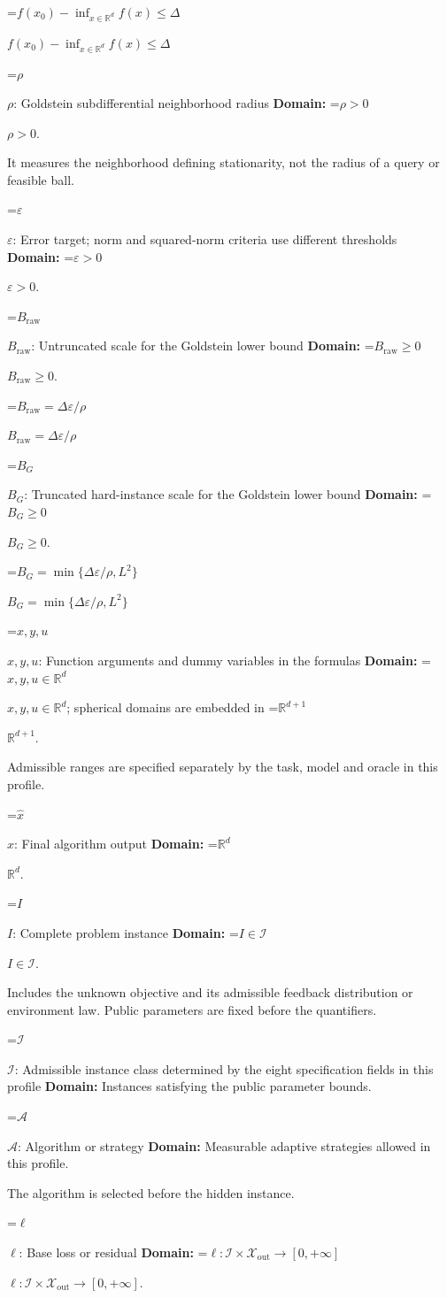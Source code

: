 \documentclass[10pt,a4paper]{article}
\newcommand{\AtlasMath}[1]{\par\begingroup\centering\setbox0=\hbox{$\displaystyle #1$}\ifdim\wd0>1.4\linewidth\typeout{ATLAS WIDE FORMULA: \the\wd0}\fi\ifdim\wd0>\linewidth\resizebox{\linewidth}{!}{\box0}\else\box0\fi\par\endgroup}
\newcommand{\AtlasInlineMath}[1]{\begingroup\setbox0=\hbox{$#1$}\ifdim\wd0>.4\linewidth\endgroup\AtlasMath{#1}\else\endgroup$#1$\fi}
\begin{document}
\AtlasInlineMath{f(x_0)-\inf_{x\in\mathbb{R}^d}f(x)\le\Delta}

\AtlasInlineMath{\rho}: Goldstein subdifferential neighborhood radius \textbf{Domain:} \AtlasInlineMath{\rho>0}.

It measures the neighborhood defining stationarity, not the radius of a query or feasible ball.

\AtlasInlineMath{\varepsilon}: Error target; norm and squared-norm criteria use different thresholds \textbf{Domain:} \AtlasInlineMath{\varepsilon>0}.

\AtlasInlineMath{B_{\mathrm{raw}}}: Untruncated scale for the Goldstein lower bound \textbf{Domain:} \AtlasInlineMath{B_{\mathrm{raw}}\ge0}.

\AtlasInlineMath{B_{\mathrm{raw}}=\Delta\varepsilon/\rho}

\AtlasInlineMath{B_G}: Truncated hard-instance scale for the Goldstein lower bound \textbf{Domain:} \AtlasInlineMath{B_G\ge0}.

\AtlasInlineMath{B_G=\min\{\Delta\varepsilon/\rho,L^2\}}

\AtlasInlineMath{x,y,u}: Function arguments and dummy variables in the formulas \textbf{Domain:} \AtlasInlineMath{x,y,u\in\mathbb{R}^d}; spherical domains are embedded in \AtlasInlineMath{\mathbb{R}^{d+1}}.

Admissible ranges are specified separately by the task, model and oracle in this profile.

\AtlasInlineMath{\widehat{x}}: Final algorithm output \textbf{Domain:} \AtlasInlineMath{\mathbb{R}^d}.

\AtlasInlineMath{I}: Complete problem instance \textbf{Domain:} \AtlasInlineMath{I\in\mathcal{I}}.

Includes the unknown objective and its admissible feedback distribution or environment law. Public parameters are fixed before the quantifiers.

\AtlasInlineMath{\mathcal{I}}: Admissible instance class determined by the eight specification fields in this profile \textbf{Domain:} Instances satisfying the public parameter bounds.

\AtlasInlineMath{\mathcal{A}}: Algorithm or strategy \textbf{Domain:} Measurable adaptive strategies allowed in this profile.

The algorithm is selected before the hidden instance.

\AtlasInlineMath{\ell}: Base loss or residual \textbf{Domain:} \AtlasInlineMath{\ell:\mathcal{I}\times\mathcal{X}_{\mathrm{out}}\to[0,+\infty]}.
\end{document}
